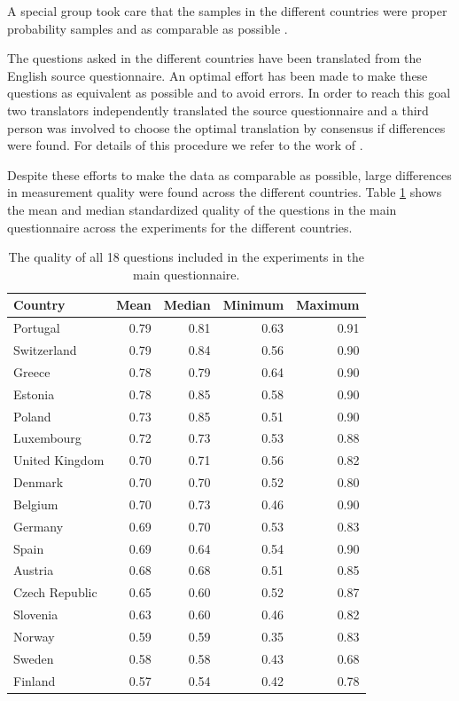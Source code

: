 \documentclass[a4paper,12pt]{article}
\begin{document}
A special group took care that the samples in the different countries were proper probability samples and as comparable as possible \citep{hader_2007}. 

The questions asked in the different countries have been translated from the English source questionnaire. An optimal effort has been made to make these questions as equivalent as possible and to avoid errors. In order to reach this goal two translators independently translated the source questionnaire and a third person was involved to choose the optimal translation by consensus if differences were found. For details of this procedure we refer to the work of \citet{harkness_cross-cultural_2002}.

	 Despite these efforts to make the data as comparable as possible, large differences in measurement quality were found across the different countries.  Table \ref{tab:countries} shows the mean and median standardized quality of the questions in the main questionnaire across the experiments for the different countries.

\begin{table}[hbt]\centering\caption{The quality of all 18 questions included in the experiments in the main questionnaire.\label{tab:countries}}
\begin{tabular}{lrrrr}
\hline
Country&Mean&Median&Minimum&Maximum\\\hline
Portugal&0.79&0.81&0.63&0.91\\
Switzerland&0.79&0.84&0.56&0.90\\
Greece&0.78&0.79&0.64&0.90\\
Estonia&0.78&0.85&0.58&0.90\\
Poland&0.73&0.85&0.51&0.90\\
Luxembourg&0.72&0.73&0.53&0.88\\
United Kingdom&0.70&0.71&0.56&0.82\\
Denmark&0.70&0.70&0.52&0.80\\
Belgium&0.70&0.73&0.46&0.90\\
Germany&0.69&0.70&0.53&0.83\\
Spain&0.69&0.64&0.54&0.90\\
Austria&0.68&0.68&0.51&0.85\\
Czech Republic&0.65&0.60&0.52&0.87\\
Slovenia&0.63&0.60&0.46&0.82\\
Norway&0.59&0.59&0.35&0.83\\
Sweden&0.58&0.58&0.43&0.68\\
Finland&0.57&0.54&0.42&0.78\\
	\hline
\end{tabular}
\end{table}
\end{document}
